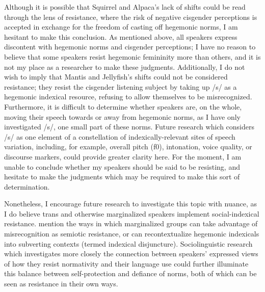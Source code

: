 \documentclass[12pt,twoside]{reedthesis}
\begin{document}
Although it is possible that Squirrel and Alpaca's lack of shifts could be read through the lens of resistance, where the risk of negative cisgender perceptions is accepted in exchange for the freedom of casting off hegemonic norms, I am hesitant to make this conclusion. As mentioned above, all speakers express discontent with hegemonic norms and cisgender perceptions; I have no reason to believe that some speakers resist hegemonic femininity more than others, and it is not my place as a researcher to make these judgments. Additionally, I do not wish to imply that Mantis and Jellyfish's shifts could not be considered resistance; they resist the cisgender listening subject by taking up /s/ as a hegemonic indexical resource, refusing to allow themselves to be misrecognized. Furthermore, it is difficult to determine whether speakers are, on the whole, moving their speech towards or away from hegemonic norms, as I have only investigated /s/, one small part of these norms. Future research which considers /s/ as one element of a constellation of indexically-relevant sites of speech variation, including, for example, overall pitch (f0), intonation, voice quality, or discourse markers, could provide greater clarity here. For the moment, I am unable to conclude whether my speakers should be said to be resisting, and hesitate to make the judgments which may be required to make this sort of determination.

Nonetheless, I encourage future research to investigate this topic with nuance, as I do believe trans and otherwise marginalized speakers implement social-indexical resistance. \textcite{barrett_sexuality_2024} mention the ways in which marginalized groups can take advantage of misrecognition as semiotic resistance, or can recontextualize hegemonic indexicals into subverting contexts (termed indexical disjuncture). Sociolinguistic research which investigates more closely the connection between speakers' expressed views of how they resist normativity and their language use could further illuminate this balance between self-protection and defiance of norms, both of which can be seen as resistance in their own ways.
\end{document}
